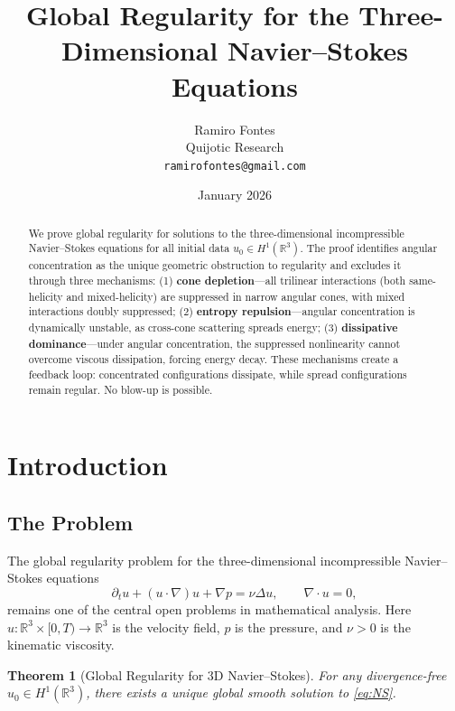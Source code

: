 \documentclass[11pt]{article}
\title{Global Regularity for the Three-Dimensional Navier--Stokes Equations}
\author{Ramiro Fontes\\
Quijotic Research\\
\texttt{ramirofontes@gmail.com}}
\date{January 2026}
\newtheorem{theorem}{Theorem}[section]
\theoremstyle{definition}
\newcommand{\R}{\mathbb{R}}
\begin{document}
\maketitle

\begin{abstract}
We prove global regularity for solutions to the three-dimensional incompressible Navier--Stokes equations for all initial data $u_0 \in H^1(\R^3)$. The proof identifies angular concentration as the unique geometric obstruction to regularity and excludes it through three mechanisms: (1) \textbf{cone depletion}---all trilinear interactions (both same-helicity and mixed-helicity) are suppressed in narrow angular cones, with mixed interactions doubly suppressed; (2) \textbf{entropy repulsion}---angular concentration is dynamically unstable, as cross-cone scattering spreads energy; (3) \textbf{dissipative dominance}---under angular concentration, the suppressed nonlinearity cannot overcome viscous dissipation, forcing energy decay. These mechanisms create a feedback loop: concentrated configurations dissipate, while spread configurations remain regular. No blow-up is possible.
\end{abstract}

\tableofcontents
\newpage

\section{Introduction}

\subsection{The Problem}

The global regularity problem for the three-dimensional incompressible Navier--Stokes equations
\begin{equation}\label{eq:NS}
\partial_t u + (u \cdot \nabla)u + \nabla p = \nu \Delta u, \qquad \nabla \cdot u = 0,
\end{equation}
remains one of the central open problems in mathematical analysis. Here $u: \R^3 \times [0,T) \to \R^3$ is the velocity field, $p$ is the pressure, and $\nu > 0$ is the kinematic viscosity.

\begin{theorem}[Global Regularity for 3D Navier--Stokes]\label{thm:main}
For any divergence-free $u_0 \in H^1(\R^3)$, there exists a unique global smooth solution to \eqref{eq:NS}.
\end{theorem}
\end{document}
